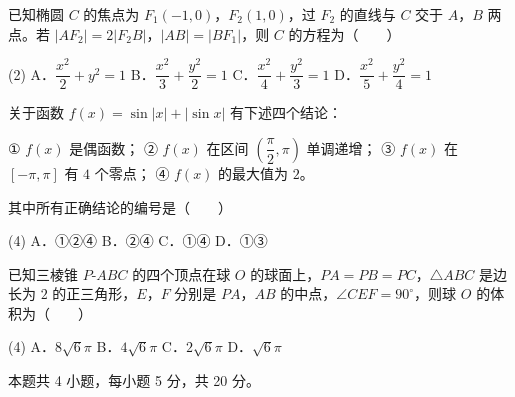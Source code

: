 \begin{question}
已知椭圆 $C$ 的焦点为 $F_1(-1,0)$，$F_2(1,0)$，过 $F_2$ 的直线与 $C$ 交于 $A$，$B$ 两点。若 $\left|AF_2\right|=2\left|F_2B\right|$，$|AB|=\left|BF_1\right|$，则 $C$ 的方程为\mbox{（　　）}

\begin{gkopts}(2)
\task A．$\dfrac{x^{2}}2+y^{2}=1$
\task B．$\dfrac{x^{2}}3+\dfrac{y^{2}}2=1$
\task C．$\dfrac{x^{2}}4+\dfrac{y^{2}}3=1$
\task D．$\dfrac{x^{2}}5+\dfrac{y^{2}}4=1$
\end{gkopts}

\end{question}
\begin{question}
关于函数 $f(x)=\sin|x|+|\sin x|$ 有下述四个结论：

  ① $f(x)$ 是偶函数；
  ② $f(x)$ 在区间 $\left(\dfrac\pi2,\pi\right)$ 单调递增；
  ③ $f(x)$ 在 $[-\pi,\pi]$ 有 $4$ 个零点；
  ④ $f(x)$ 的最大值为 $2$。

其中所有正确结论的编号是\mbox{（　　）}

\begin{gkopts}(4)
\task A．①②④
\task B．②④
\task C．①④
\task D．①③
\end{gkopts}

\end{question}
\begin{question}
已知三棱锥 $P\text{-}ABC$ 的四个顶点在球 $O$ 的球面上，$PA=PB=PC$，$\triangle ABC$ 是边长为 $2$ 的正三角形，$E$，$F$ 分别是 $PA$，$AB$ 的中点，$\angle CEF=90^\circ$，则球 $O$ 的体积为\mbox{（　　）}

\begin{gkopts}(4)
\task A．$8\sqrt6\pi$
\task B．$4\sqrt6\pi$
\task C．$2\sqrt6\pi$
\task D．$\sqrt6\pi$
\end{gkopts}

\par\medskip

\end{question}

\begin{gktip}
本题共 4 小题，每小题 5 分，共 20 分。
\end{gktip}

